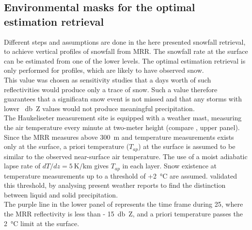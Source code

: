 \subsection{Environmental masks for the optimal estimation retrieval}\label{sec:pre_snow}

Different steps and assumptions are done in the here presented snowfall retrieval, to achieve vertical profiles of snowfall from MRR. The snowfall rate at the surface can be estimated from one of the lower levels. The optimal estimation retrieval is only performed for profiles, which are likely to have observed snow. 
\\
This value was  chosen as sensitivity studies \citep[e.g.][]{wood_level_2013} that a days worth of such reflectivities would produce only a trace of snow.  Such a value therefore guarantees that a significatn snow event is not missed and that any storms with lower \SI{}{\decibel Z} values would not produce meaningful precipitation.
\\
The Haukeliseter measurement site is equipped with a weather mast, measuring the air temperature every minute at two-meter height (compare , upper panel). 
%
Since the MRR measures above \SI{300}{\metre} and temperature measurements exists only at the surface, a priori temperature ($T_{ap}$) at the surface is assumed to be similar to the observed near-surface air temperature. The use of a moist adiabatic lapse rate of $dT/dz = \SI{5}{\kelvin\per\km}$ gives $T_{ap}$ in each layer. 
Snow existence at temperature measurements up to a threshold of +\SI{2}{\celsius} are assumed. \citet{liu_g._deriving_2008} validated this threshold, by analysing present weather reports to find the distinction between liquid and solid precipitation.\\
The purple line in the lower panel of  represents the time frame during \SI{25}{\dec}, where the MRR reflectivity is less than \SI{- 15}{\decibel Z}, and a priori temperature passes the \SI{2}{\celsius} limit at the surface.  
